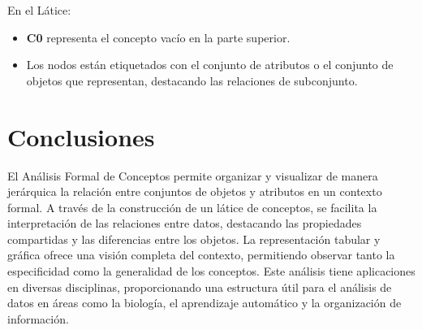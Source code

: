 En el Látice:
\begin{itemize}
    \item \textbf{C0} representa el concepto vacío en la parte superior.
    \item Los nodos están etiquetados con el conjunto de atributos o el conjunto de objetos que representan, destacando las relaciones de subconjunto.
\end{itemize}

\section{Conclusiones}

El Análisis Formal de Conceptos permite organizar y visualizar de manera jerárquica la relación entre conjuntos de objetos y atributos en un contexto formal. A través de la construcción de un látice de conceptos, se facilita la interpretación de las relaciones entre datos, destacando las propiedades compartidas y las diferencias entre los objetos. La representación tabular y gráfica ofrece una visión completa del contexto, permitiendo observar tanto la especificidad como la generalidad de los conceptos. Este análisis tiene aplicaciones en diversas disciplinas, proporcionando una estructura útil para el análisis de datos en áreas como la biología, el aprendizaje automático y la organización de información.
